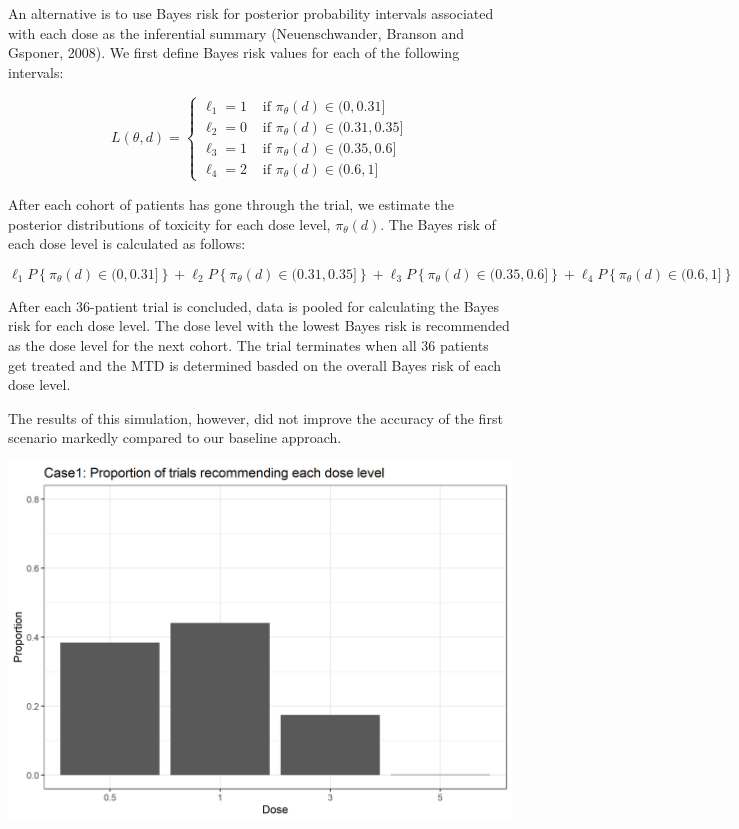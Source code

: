 \documentclass[
]{article}
\begin{document}
An alternative is to use Bayes risk for posterior probability intervals
associated with each dose as the inferential summary (Neuenschwander,
Branson and Gsponer, 2008). We first define Bayes risk values for each
of the following intervals:

\[
L(\theta, d)= \begin{cases}\ell_1=1 & \text { if } \pi_\theta(d) \in(0,0.31] \\
\ell_2=0 & \text { if } \pi_\theta(d) \in(0.31,0.35] \\
\ell_3=1 & \text { if } \pi_\theta(d) \in(0.35,0.6] \\
\ell_4=2 & \text { if } \pi_\theta(d) \in(0.6,1]\end{cases}
\]

After each cohort of patients has gone through the trial, we estimate
the posterior distributions of toxicity for each dose level,
\(\pi_\theta(d)\). The Bayes risk of each dose level is calculated as
follows:

\[
\ell_1 P\left\{\pi_\theta(d) \in (0,0.31]\right \}+\ell_2 P\left\{\pi_\theta(d) \in(0.31,0.35]\right\}+\ell_3 P\left\{\pi_\theta(d) \in(0.35,0.6]\right\}+\ell_4 P\left\{\pi_\theta(d) \in(0.6,1]\right\}
\]

After each 36-patient trial is concluded, data is pooled for calculating
the Bayes risk for each dose level. The dose level with the lowest Bayes
risk is recommended as the dose level for the next cohort. The trial
terminates when all 36 patients get treated and the MTD is determined
basded on the overall Bayes risk of each dose level.

The results of this simulation, however, did not improve the accuracy of
the first scenario markedly compared to our baseline approach.

\includegraphics{zikai_sim_results/Case1_Proportion of trials recommending each dose level.png}
\end{document}
